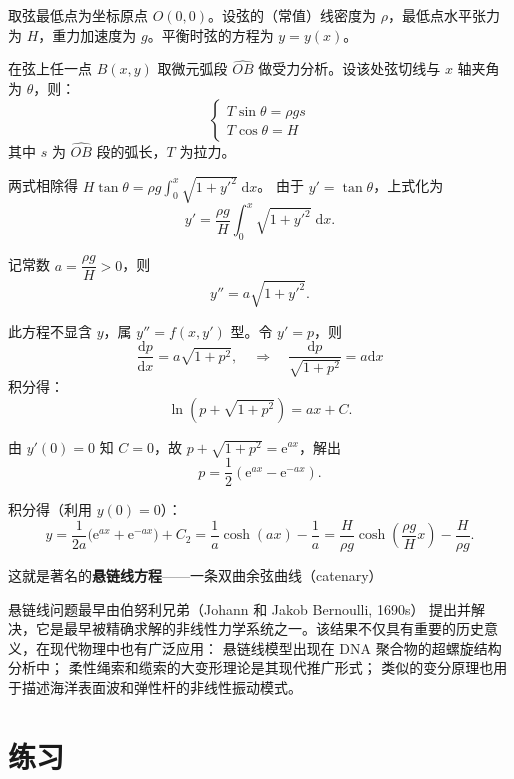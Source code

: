 \documentclass[lang=cn,11pt]{elegantbook}
\begin{document}
\begin{solution}
取弦最低点为坐标原点 $O(0,0)$。设弦的（常值）线密度为 $\rho$，最低点水平张力为 $H$，重力加速度为 $g$。平衡时弦的方程为 $y=y(x)$。

在弦上任一点 $B(x,y)$ 取微元弧段 $\widehat{OB}$ 做受力分析。设该处弦切线与 $x$ 轴夹角为 $\theta$，则：
\[
\begin{cases}
T\sin\theta = \rho g s \\
T\cos\theta = H
\end{cases}
\]
其中 $s$ 为 $\widehat{OB}$ 段的弧长，$T$ 为拉力。

两式相除得 $H\tan\theta=\rho g\displaystyle\int_{0}^{x}\sqrt{1+y'^{2}}\;\mathrm{d}x$。
由于 $y'=\tan\theta$，上式化为
\[
y'=\frac{\rho g}{H}\int_{0}^{x}\sqrt{1+y'^{2}}\;\mathrm{d}x.
\]

记常数 $a=\dfrac{\rho g}{H}>0$，则
\[
y''=a\sqrt{1+y'^{2}}. \tag{††}
\]

此方程不显含 $y$，属 $y''=f(x,y')$ 型。令 $y'=p$，则
\[
\frac{\mathrm{d}p}{\mathrm{d}x}=a\sqrt{1+p^{2}},\quad
\Longrightarrow\quad
\frac{\mathrm{d}p}{\sqrt{1+p^{2}}} = a\mathrm{d}x
\]
积分得：
\[
\ln(p+\sqrt{1+p^{2}})=ax+C.
\]

由 $y'(0)=0$ 知 $C=0$，故 $p+\sqrt{1+p^{2}}=\mathrm{e}^{ax}$，解出
\[
p=\dfrac12(\mathrm{e}^{ax}-\mathrm{e}^{-ax}).
\]

积分得（利用 $y(0)=0$）：
\[
y=\frac1{2a}\bigl(\mathrm{e}^{ax}+\mathrm{e}^{-ax}\bigr)+C_2
=\frac1a\cosh(ax)-\frac{1}{a}
=\frac{H}{\rho g}\cosh\!\left(\frac{\rho g}{H}x\right)-\frac{H}{\rho g}.
\]

这就是著名的\textbf{悬链线方程}——一条双曲余弦曲线（catenary）
\end{solution}

\begin{remark}
悬链线问题最早由伯努利兄弟（Johann 和 Jakob Bernoulli, 1690s）
提出并解决，它是最早被精确求解的非线性力学系统之一。该结果不仅具有重要的历史意义，在现代物理中也有广泛应用：
悬链线模型出现在 DNA 聚合物的超螺旋结构分析中；
柔性绳索和缆索的大变形理论是其现代推广形式；
类似的变分原理也用于描述海洋表面波和弹性杆的非线性振动模式。
\end{remark}


\section{练习}
\end{document}
